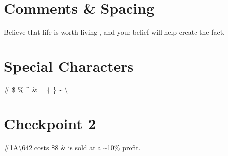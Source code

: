\documentclass[a4paper, 12pt]{report}
\begin{document}
\vspace{12pt}

\section{Comments \& Spacing}

Believe that life is worth living%
, and your belief will help create the fact.


\section{Special Characters}

\#   \$  \%  \^{}  \&  \_  \{  \}  \~{}  \textbackslash


\section{Checkpoint 2}
\#1A\textbackslash642 costs \$8 \& is sold at a \~{}10\% profit.
\end{document}
